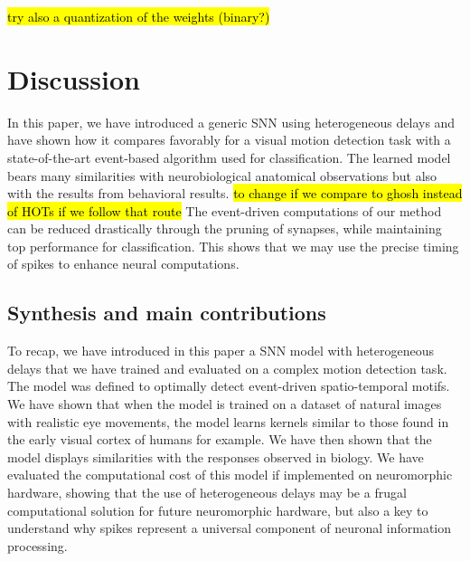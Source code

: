 \documentclass[default]{sn-jnl}%
\theoremstyle{thmstyleone}%
\theoremstyle{thmstyletwo}%
\theoremstyle{thmstylethree}%
\newcommand{\note}[1]{{\sethlcolor{yellow}\hl{#1}}}
\begin{document}
\note{try also a quantization of the weights (binary?)}
%
\section{Discussion}
In this paper, we have introduced a generic SNN using heterogeneous delays and have shown how it compares favorably for a visual motion detection task with a state-of-the-art event-based algorithm used for classification. The learned model bears many similarities with neurobiological anatomical observations but also with the results from behavioral results. \note{to change if we compare to ghosh instead of HOTs if we follow that route} The event-driven computations of our method can be reduced drastically through the pruning of synapses, while maintaining top performance for classification. This shows that we may use the precise timing of spikes to enhance neural computations. 
%
\subsection{Synthesis and main contributions}
To recap, we have introduced in this paper a SNN model with heterogeneous delays that we have trained and evaluated on a complex motion detection task. The model was defined to optimally detect event-driven spatio-temporal motifs. We have shown that when the model is trained on a dataset of natural images with realistic eye movements, the model learns kernels similar to those found in the early visual cortex of humans for example. We have then shown that the model displays similarities with the responses observed in biology. We have evaluated the computational cost of this model if implemented on neuromorphic hardware, showing that the use of heterogeneous delays may be a frugal computational solution for future neuromorphic hardware, but also a key to understand why spikes represent a universal component of neuronal information processing.
\end{document}
